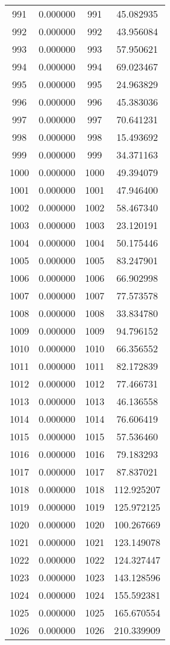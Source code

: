 \documentclass[12pt]{article}
\begin{document}
\begin{longtable}{@{}cccc@{}}
991 & 0.000000 & 991 & 45.082935 \\
992 & 0.000000 & 992 & 43.956084 \\
993 & 0.000000 & 993 & 57.950621 \\
994 & 0.000000 & 994 & 69.023467 \\
995 & 0.000000 & 995 & 24.963829 \\
996 & 0.000000 & 996 & 45.383036 \\
997 & 0.000000 & 997 & 70.641231 \\
998 & 0.000000 & 998 & 15.493692 \\
999 & 0.000000 & 999 & 34.371163 \\
1000 & 0.000000 & 1000 & 49.394079 \\
1001 & 0.000000 & 1001 & 47.946400 \\
1002 & 0.000000 & 1002 & 58.467340 \\
1003 & 0.000000 & 1003 & 23.120191 \\
1004 & 0.000000 & 1004 & 50.175446 \\
1005 & 0.000000 & 1005 & 83.247901 \\
1006 & 0.000000 & 1006 & 66.902998 \\
1007 & 0.000000 & 1007 & 77.573578 \\
1008 & 0.000000 & 1008 & 33.834780 \\
1009 & 0.000000 & 1009 & 94.796152 \\
1010 & 0.000000 & 1010 & 66.356552 \\
1011 & 0.000000 & 1011 & 82.172839 \\
1012 & 0.000000 & 1012 & 77.466731 \\
1013 & 0.000000 & 1013 & 46.136558 \\
1014 & 0.000000 & 1014 & 76.606419 \\
1015 & 0.000000 & 1015 & 57.536460 \\
1016 & 0.000000 & 1016 & 79.183293 \\
1017 & 0.000000 & 1017 & 87.837021 \\
1018 & 0.000000 & 1018 & 112.925207 \\
1019 & 0.000000 & 1019 & 125.972125 \\
1020 & 0.000000 & 1020 & 100.267669 \\
1021 & 0.000000 & 1021 & 123.149078 \\
1022 & 0.000000 & 1022 & 124.327447 \\
1023 & 0.000000 & 1023 & 143.128596 \\
1024 & 0.000000 & 1024 & 155.592381 \\
1025 & 0.000000 & 1025 & 165.670554 \\
1026 & 0.000000 & 1026 & 210.339909 \\

\end{longtable}
\end{document}
